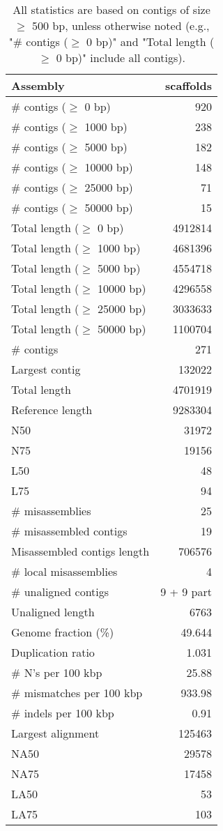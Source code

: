 \documentclass[12pt,a4paper]{article}
\begin{document}
\begin{table}[ht]
\begin{center}
\caption{All statistics are based on contigs of size $\geq$ 500 bp, unless otherwise noted (e.g., "\# contigs ($\geq$ 0 bp)" and "Total length ($\geq$ 0 bp)" include all contigs).}
\begin{tabular}{|l*{1}{|r}|}
\hline
Assembly & scaffolds \\ \hline
\# contigs ($\geq$ 0 bp) & 920 \\ \hline
\# contigs ($\geq$ 1000 bp) & 238 \\ \hline
\# contigs ($\geq$ 5000 bp) & 182 \\ \hline
\# contigs ($\geq$ 10000 bp) & 148 \\ \hline
\# contigs ($\geq$ 25000 bp) & 71 \\ \hline
\# contigs ($\geq$ 50000 bp) & 15 \\ \hline
Total length ($\geq$ 0 bp) & 4912814 \\ \hline
Total length ($\geq$ 1000 bp) & 4681396 \\ \hline
Total length ($\geq$ 5000 bp) & 4554718 \\ \hline
Total length ($\geq$ 10000 bp) & 4296558 \\ \hline
Total length ($\geq$ 25000 bp) & 3033633 \\ \hline
Total length ($\geq$ 50000 bp) & 1100704 \\ \hline
\# contigs & 271 \\ \hline
Largest contig & 132022 \\ \hline
Total length & 4701919 \\ \hline
Reference length & 9283304 \\ \hline
N50 & 31972 \\ \hline
N75 & 19156 \\ \hline
L50 & 48 \\ \hline
L75 & 94 \\ \hline
\# misassemblies & 25 \\ \hline
\# misassembled contigs & 19 \\ \hline
Misassembled contigs length & 706576 \\ \hline
\# local misassemblies & 4 \\ \hline
\# unaligned contigs & 9 + 9 part \\ \hline
Unaligned length & 6763 \\ \hline
Genome fraction (\%) & 49.644 \\ \hline
Duplication ratio & 1.031 \\ \hline
\# N's per 100 kbp & 25.88 \\ \hline
\# mismatches per 100 kbp & 933.98 \\ \hline
\# indels per 100 kbp & 0.91 \\ \hline
Largest alignment & 125463 \\ \hline
NA50 & 29578 \\ \hline
NA75 & 17458 \\ \hline
LA50 & 53 \\ \hline
LA75 & 103 \\ \hline
\end{tabular}
\end{center}
\end{table}
\end{document}
